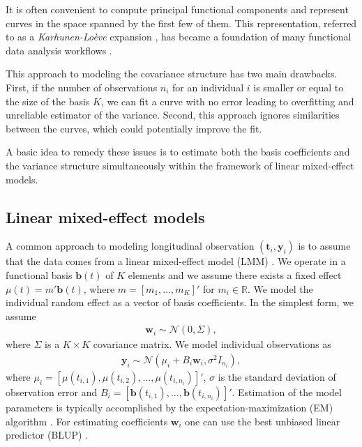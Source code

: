 \documentclass[preprint]{imsart}
\numberwithin{equation}{section}
\theoremstyle{plain}
\newcommand{\cN}{\mathcal{N}}
\newcommand{\R}{\mathbb{R}}
\newcommand{\bb}{\mathbf{b}}
\newcommand{\bw}{\mathbf{w}}
\begin{document}
It is often convenient to compute principal functional components and represent curves in the space spanned by the first few of them. This representation, referred to as a {\it Karhunen-Lo\`eve} expansion \citep{watanabe1965karhunen,kosambi2016statistics}, has became a foundation of many functional data analysis workflows \citep{ramsay1991some,yao2005linear,cnaan1997tutorial,laird1988missing,horvath2012inference,besse1997simultaneous}. %

This approach to modeling the covariance structure has two main drawbacks. First, if the number of observations $n_i$ for an individual $i$ is smaller or equal to the size of the basis $K$, we can fit a curve with no error leading to overfitting and unreliable estimator of the variance. Second, this approach ignores similarities between the curves, which could potentially improve the fit.

A basic idea to remedy these issues is to estimate both the basis coefficients and the variance structure simultaneously within the framework of linear mixed-effect models.

\subsection{Linear mixed-effect models}\label{ss:lmm}

A common approach to modeling longitudinal observation $(\mathbf{t}_i, \mathbf{y}_i)$ is to assume that the data comes from a linear mixed-effect model (LMM) \citep{verbeke1997linear, zeger1988models}. We operate in a functional basis $\bb(t)$ of $K$ elements and we assume there exists a fixed effect $\mu(t) = m' \bb(t)$, where $m = [m_1,...,m_K]'$ for $m_i \in \R$. We model the individual random effect as a vector of basis coefficients. In the simplest form, we assume
\begin{align}\label{eq:latent-probabilistic}
 \mathbf{w}_i \sim \cN(0, \Sigma),
\end{align}
where $\Sigma$ is a $K \times K$ covariance matrix. We model individual observations as
\begin{align}\label{eq:probabilistic}
 \mathbf{y}_i \sim \cN(\mu_i + B_i\mathbf{w}_i, \sigma^2I_{n_i}),
\end{align}
where $\mu_i = [\mu(t_{i,1}),\mu(t_{i,2}),...,\mu(t_{i,n_i})]'$, $\sigma$ is the standard deviation of observation error and $B_i = [\bb(t_{i,1}),...,\bb(t_{i,n_i})]'$. Estimation of the model parameters is typically accomplished by the expectation-maximization (EM) algorithm \citep{laird1982random}. For estimating coefficients $\bw_i$ one can use the best unbiased linear predictor (BLUP) \citep{henderson1950estimation,robinson1991blup}. %
\end{document}
